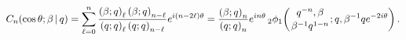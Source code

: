 \[\mathop{C_{n}\/}\nolimits\!\left(\mathop{\cos\/}\nolimits\theta;\beta\,|\,q%
\right)=\sum_{\ell=0}^{n}\frac{\left(\beta;q\right)_{\ell}\left(\beta;q\right)%
_{n-\ell}}{\left(q;q\right)_{\ell}\left(q;q\right)_{n-\ell}}e^{i(n-2\ell)%
\theta}=\frac{\left(\beta;q\right)_{n}}{\left(q;q\right)_{n}}e^{in\theta}%
\mathop{{{}_{2}\phi_{1}}\/}\nolimits\!\left({q^{-n},\beta\atop\beta^{-1}q^{1-n%
}};q,\beta^{-1}qe^{-2i\theta}\right).\]